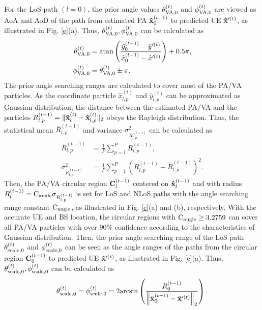 \documentclass[journal,12pt,onecolumn,draftclsnofoot,]{IEEEtran}
\begin{document}
For the LoS path $(l=0)$, the prior angle values $\theta _{{\rm{VA,0}}}^{(t )}$ and $\phi _{{\rm{VA,0}}}^{(t)}$ are viewed as AoA and AoD of the path from estimated PA ${\bf{\hat x}}_0^{({t - 1} )}$ to predicted UE ${\bf{\hat x}}{'^{(t )}}$, as illustrated in Fig. \ref{e}(a). Thus, $\theta _{{\rm{VA,0}}}^{(t )},\phi _{{\rm{VA,0}}}^{(t )}$ can be calculated as
\begin{subequations}
\begin{align}
\theta _{{\rm{VA,0}}}^{\left(t \right)} &= {\rm{atan}}\left({\frac{{\hat y_0^{\left({t - 1} \right)} - \hat y{'^{\left(t \right)}}}}{{\hat x_0^{\left({t - 1} \right)} - \hat x{'^{\left(t \right)}}}}} \right)+0.5\pi,\label{17a}\\
\phi _{{\rm{VA,0}}}^{\left(t \right)} &= \theta _{{\rm{VA,0}}}^{\left(t \right)} \pm \pi. \label{17b}
\end{align}
\end{subequations}
The prior angle searching ranges are calculated to cover most of the PA/VA particles. 
As the coordinate particle $\hat x_{l,p}^{(t )} $ and $\hat y_{l,p}^{(t )}$ can be approximated as Gaussian distribution, the distance between the estimated PA/VA and the particles ${R^{(t-1)}_{l,p}}=\|{\bf{\hat x}}_l^{(t )}-{\bf{\hat x}}_{l,p}^{(t )}\|_2$ obeys the Rayleigh distribution.
Thus, the statistical mean $\overline R _{l,p}^{(t-1 )}$ and variance $\sigma^2_{{R^{(t-1 )}_{l,p}}}$ can be calculated as
\begin{align}
\overline R _{l,p}^{\left(t-1 \right)}&= \frac{1}{P}\sum\limits_{p = 1}^P{R^{\left(t-1 \right)}_{l,p}},\\
\sigma^2_{{R^{\left(t-1 \right)}_{l,p}}} &=\frac{1}{P}\sum\limits_{p = 1}^P{{\left( {R^{\left(t-1 \right)}_{l,p}} - \overline R _{l,p}^{\left(t-1 \right)} \right)}^{2}}.
\end{align}
Then, the PA/VA circular region ${\bf{C}}^{(t-1)}_l$ centered on ${\bf{\hat x}}_l^{({t - 1})}$ and with radius ${R^{(t-1)}_{l}}={{\rm C}_{\rm angle}}\sigma_{{R^{(t-1)}_{l,p}}}$ is set for LoS and NLoS paths with the angle searching range constant ${{\rm C}_{\rm angle}}$, as illustrated in Fig. \ref{e}(a) and (b), respectively. 
With the accurate UE and BS location, the circular regions with ${{\rm C}_{\rm angle}}\ge3.2759$ can cover all PA/VA particles with over 90\% confidence according to the characteristics of Gaussian distribution. 
Then, the prior angle searching range of the LoS path $\theta _{{\rm{scale,0}}}^{(t )}$ and $\phi _{{\rm{scale,0}}}^{(t )}$ can be seen as the angle ranges of the paths from the circular region ${\bf{C}}^{(t-1 )}_0$ to predicted UE ${\bf{\hat x}}{'^{(t )}}$, as illustrated in Fig. \ref{e}(a). 
Thus, $\theta _{{\rm{scale,0}}}^{(t )},\phi _{{\rm{scale,0}}}^{(t )}$ can be calculated as
\begin{equation}
\theta _{{\rm{scale,0}}}^{\left(t \right)} =\phi _{{\rm{scale,0}}}^{\left(t \right)}= 2{\rm{arcsin}}\left({\frac{{R _0^{\left({t - 1} \right)}}}{{\left\| {\hat {\bf{x}}_0^{\left({t - 1} \right)} - \hat {\bf{x}}{'^{\left(t \right)}}} \right\|}_2 }} \right).\label{19}
\end{equation}
\end{document}
